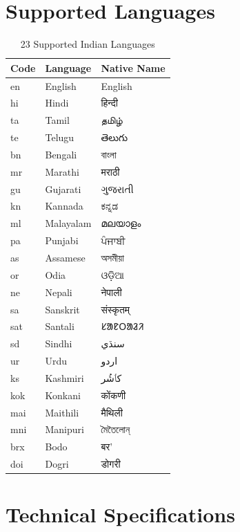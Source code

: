 \documentclass[12pt,a4paper]{article}
\begin{document}
\section{Supported Languages}
\begin{table}[H]
\centering
\small
\begin{tabularx}{\textwidth}{|l|l|X|}
\hline
\rowcolor{lightgray}
\textbf{Code} & \textbf{Language} & \textbf{Native Name} \\
\hline
en & English & English \\
\hline
hi & Hindi & हिन्दी \\
\hline
ta & Tamil & தமிழ் \\
\hline
te & Telugu & తెలుగు \\
\hline
bn & Bengali & বাংলা \\
\hline
mr & Marathi & मराठी \\
\hline
gu & Gujarati & ગુજરાતી \\
\hline
kn & Kannada & ಕನ್ನಡ \\
\hline
ml & Malayalam & മലയാളം \\
\hline
pa & Punjabi & ਪੰਜਾਬੀ \\
\hline
as & Assamese & অসমীয়া \\
\hline
or & Odia & ଓଡ଼ିଆ \\
\hline
ne & Nepali & नेपाली \\
\hline
sa & Sanskrit & संस्कृतम् \\
\hline
sat & Santali & ᱥᱟᱱᱛᱟᱲᱤ \\
\hline
sd & Sindhi & سنڌي \\
\hline
ur & Urdu & اردو \\
\hline
ks & Kashmiri & کٲشُر \\
\hline
kok & Konkani & कोंकणी \\
\hline
mai & Maithili & मैथिली \\
\hline
mni & Manipuri & মৈতৈলোন্ \\
\hline
brx & Bodo & बर' \\
\hline
doi & Dogri & डोगरी \\
\hline
\end{tabularx}
\caption{23 Supported Indian Languages}
\end{table}

\section{Technical Specifications}
\end{document}

